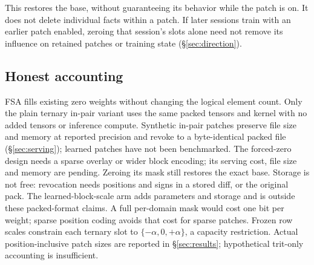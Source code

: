 \documentclass[11pt]{article}
\begin{document}
This restores the base, without guaranteeing its behavior while the patch is on. It does not delete
individual facts within a patch. If later sessions train with an earlier patch enabled, zeroing that
session's slots alone need not remove its influence on retained patches or training state
(\S\ref{sec:direction}).

\subsection{Honest accounting}
FSA fills existing zero weights without changing the logical element count. Only the plain ternary
in-pair variant uses the same packed tensors and kernel with no added tensors or inference compute.
Synthetic in-pair patches preserve file size and memory at reported precision and revoke to a
byte-identical packed file (\S\ref{sec:serving}); learned patches have not been benchmarked.
The forced-zero design needs a sparse overlay or wider block encoding; its serving cost, file size
and memory are pending. Zeroing its mask still restores the exact base. Storage is not free: revocation needs positions and signs in a stored
diff, or the original pack. The learned-block-scale arm adds parameters and storage and is outside these packed-format claims. A full per-domain mask would cost one bit
per weight; sparse position coding avoids that cost for sparse patches. Frozen row scales constrain
each ternary slot to $\{-\alpha,0,+\alpha\}$, a capacity restriction. Actual position-inclusive patch
sizes are reported in \S\ref{sec:results}; hypothetical trit-only accounting is insufficient.
\end{document}
